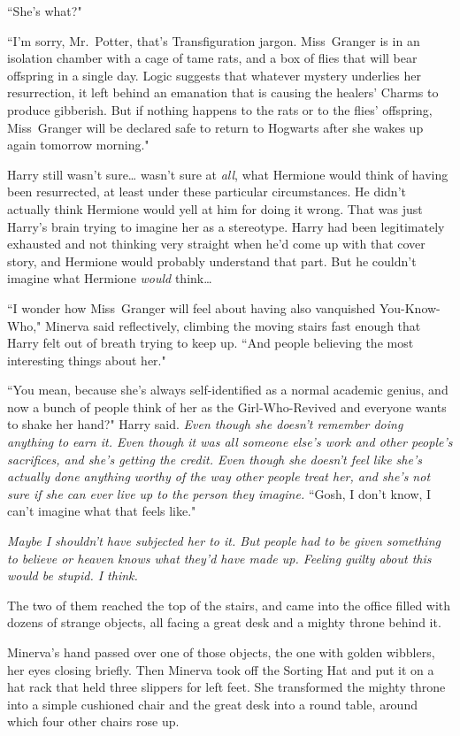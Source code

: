 ``She's what?"

``I'm sorry, Mr.~Potter, that's Transfiguration jargon. Miss~Granger is in an isolation chamber with a cage of tame rats, and a box of flies that will bear offspring in a single day. Logic suggests that whatever mystery underlies her resurrection, it left behind an emanation that is causing the healers' Charms to produce gibberish. But if nothing happens to the rats or to the flies' offspring, Miss~Granger will be declared safe to return to Hogwarts after she wakes up again tomorrow morning."

Harry still wasn't sure{\ldots} wasn't sure at \emph{all}, what Hermione would think of having been resurrected, at least under these particular circumstances. He didn't actually think Hermione would yell at him for doing it wrong. That was just Harry's brain trying to imagine her as a stereotype. Harry had been legitimately exhausted and not thinking very straight when he'd come up with that cover story, and Hermione would probably understand that part. But he couldn't imagine what Hermione \emph{would} think{\ldots}

``I wonder how Miss~Granger will feel about having also vanquished You-Know-Who," Minerva said reflectively, climbing the moving stairs fast enough that Harry felt out of breath trying to keep up. ``And people believing the most interesting things about her."

``You mean, because she's always self-identified as a normal academic genius, and now a bunch of people think of her as the Girl-Who-Revived and everyone wants to shake her hand?" Harry said. \emph{Even though she doesn't remember doing anything to earn it. Even though it was all someone else's work and other people's sacrifices, and she's getting the credit. Even though she doesn't feel like she's actually done anything worthy of the way other people treat her, and she's not sure if she can ever live up to the person they imagine.} ``Gosh, I don't know, I can't imagine what that feels like."

\emph{Maybe I shouldn't have subjected her to it. But people had to be given \emph{something} to believe or heaven knows what they'd have made up. Feeling guilty about this would be stupid. I think.}

The two of them reached the top of the stairs, and came into the office filled with dozens of strange objects, all facing a great desk and a mighty throne behind it.

Minerva's hand passed over one of those objects, the one with golden wibblers, her eyes closing briefly. Then Minerva took off the Sorting Hat and put it on a hat rack that held three slippers for left feet. She transformed the mighty throne into a simple cushioned chair and the great desk into a round table, around which four other chairs rose up.

